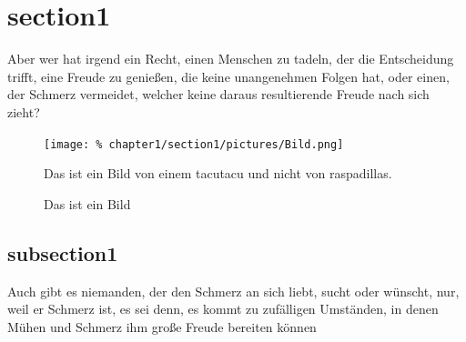 \section{section1}\label{sec:section1}
	Aber wer hat irgend ein Recht, einen Menschen zu tadeln, der die Entscheidung trifft, eine Freude zu genießen, die keine unangenehmen Folgen hat, oder einen, der Schmerz vermeidet, welcher keine daraus resultierende Freude nach sich zieht?
	
	\newpage
		
	\begin{figure}[h]
		\centering
		\texttt{[image: \%
			chapter1/section1/pictures/Bild.png]}
		\caption[Bild]{Das ist ein Bild von einem \Gls{tacutacu} %
		               und nicht von \Glspl{raspadilla}.}
		\label{pic:Bild}
	\end{figure} %
	
	\begin{figure}[h]
		\centering
		\scalebox{0.8}{}
		\caption[Plot]{Das ist ein Bild}
		\label{pic:Plot}
	\end{figure}
	
	\subsection{subsection1}
		Auch gibt es niemanden, der den Schmerz an sich liebt, sucht oder wünscht, nur, weil er Schmerz ist, es sei denn, es kommt zu zufälligen Umständen, in denen Mühen und Schmerz ihm große Freude bereiten können
		
